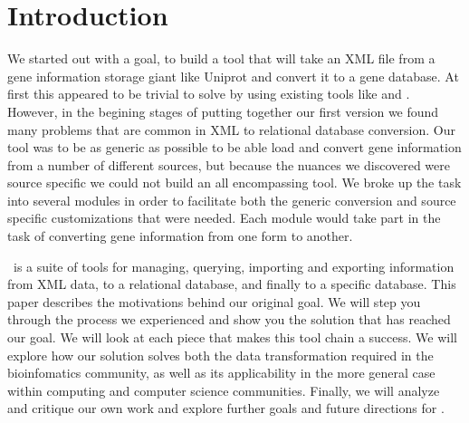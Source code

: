 \section{Introduction}
We started out with a goal, to build a tool that will take an XML file from a gene information storage giant like Uniprot and convert it to a \genmapp gene database. At first this appeared to be trivial to solve by using existing tools like  and \hibernate. However, in the begining stages of putting together our first version we found many problems that are common in XML to relational database conversion. Our tool was to be as generic as possible to be able load and convert gene information from a number of different sources, but because the nuances we discovered were source specific we could not build an all encompassing tool. We broke up the task into several modules in order to facilitate both the generic conversion and source specific customizations that were needed.  Each module would take part in the task of converting gene information from one form to another.

\xmlpipedb~is a suite of tools for managing, querying, importing and exporting information from XML data, to a relational database, and finally to a \genmapp specific database. This paper describes the motivations behind our original goal.  We will step you through the process we experienced and show you the solution that has reached our goal. We will look at each piece that makes this tool chain a success.  We will explore how our solution solves both the data transformation required in the bioinfomatics community, as well as its applicability in the more general case within computing and computer science communities.  Finally, we will analyze and critique our own work and explore further goals and future directions for \xmlpipedb.
